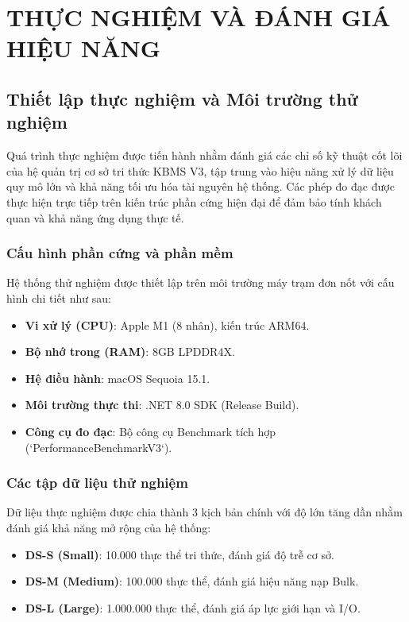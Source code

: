 \chapter{THỰC NGHIỆM VÀ ĐÁNH GIÁ HIỆU NĂNG}

\section{Thiết lập thực nghiệm và Môi trường thử nghiệm}

Quá trình thực nghiệm được tiến hành nhằm đánh giá các chỉ số kỹ thuật cốt lõi của hệ quản trị cơ sở tri thức KBMS V3, tập trung vào hiệu năng xử lý dữ liệu quy mô lớn và khả năng tối ưu hóa tài nguyên hệ thống. Các phép đo đạc được thực hiện trực tiếp trên kiến trúc phần cứng hiện đại để đảm bảo tính khách quan và khả năng ứng dụng thực tế.

\subsection{Cấu hình phần cứng và phần mềm}

Hệ thống thử nghiệm được thiết lập trên môi trường máy trạm đơn nốt với cấu hình chi tiết như sau:
\begin{itemize}
    \item \textbf{Vi xử lý (CPU)}: Apple M1 (8 nhân), kiến trúc ARM64.
    \item \textbf{Bộ nhớ trong (RAM)}: 8GB LPDDR4X.
    \item \textbf{Hệ điều hành}: macOS Sequoia 15.1.
    \item \textbf{Môi trường thực thi}: .NET 8.0 SDK (Release Build).
    \item \textbf{Công cụ đo đạc}: Bộ công cụ Benchmark tích hợp (`PerformanceBenchmarkV3`).
\end{itemize}

\subsection{Các tập dữ liệu thử nghiệm}

Dữ liệu thực nghiệm được chia thành 3 kịch bản chính với độ lớn tăng dần nhằm đánh giá khả năng mở rộng của hệ thống:
\begin{itemize}
    \item \textbf{DS-S (Small)}: 10.000 thực thể tri thức, đánh giá độ trễ cơ sở.
    \item \textbf{DS-M (Medium)}: 100.000 thực thể, đánh giá hiệu năng nạp Bulk.
    \item \textbf{DS-L (Large)}: 1.000.000 thực thể, đánh giá áp lực giới hạn và I/O.
\end{itemize}

